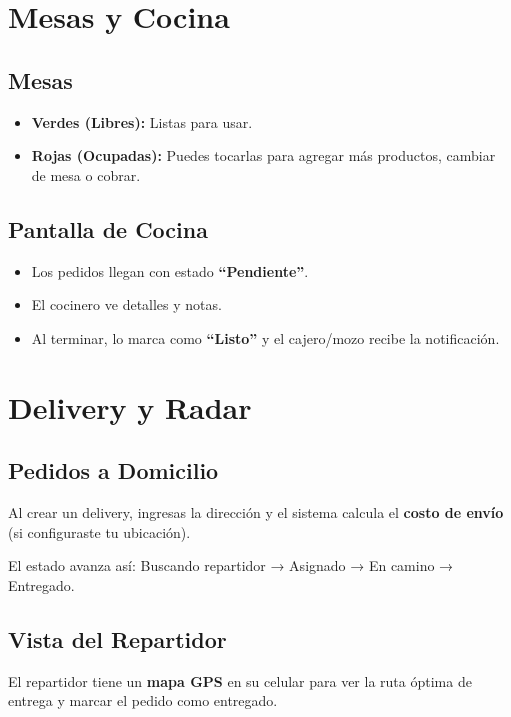 \documentclass[10pt,a4paper,twoside]{article}
\begin{document}
\section{Mesas y Cocina}

\subsection{Mesas}
\begin{itemize}[itemsep=1pt, leftmargin=15pt]
    \item \textbf{Verdes (Libres):} Listas para usar.
    \item \textbf{Rojas (Ocupadas):} Puedes tocarlas para agregar más productos, cambiar de mesa o cobrar.
\end{itemize}

\subsection{Pantalla de Cocina}
\begin{itemize}[itemsep=1pt, leftmargin=15pt]
    \item Los pedidos llegan con estado \textbf{``Pendiente''}.
    \item El cocinero ve detalles y notas.
    \item Al terminar, lo marca como \textbf{``Listo''} y el cajero/mozo recibe la notificación.
\end{itemize}

\section{Delivery y Radar}

\subsection{Pedidos a Domicilio}
Al crear un delivery, ingresas la dirección y el sistema calcula el \textbf{costo de envío} (si configuraste tu ubicación).

El estado avanza así: Buscando repartidor → Asignado → En camino → Entregado.

\subsection{Vista del Repartidor}
El repartidor tiene un \textbf{mapa GPS} en su celular para ver la ruta óptima de entrega y marcar el pedido como entregado.
\end{document}
